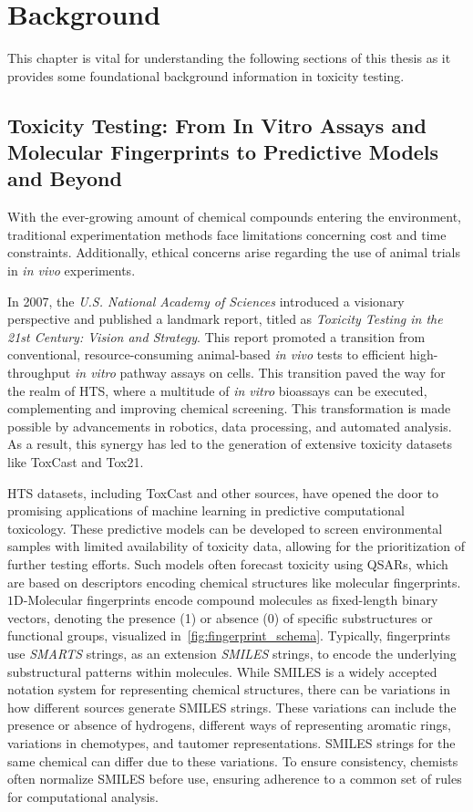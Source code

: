 \chapter{Background}\label{chap:background}
This chapter is vital for understanding the following sections of this thesis as it provides some foundational background information in toxicity testing.

\section{Toxicity Testing: From In Vitro Assays and Molecular Fingerprints to Predictive Models and Beyond}\label{sec:toxicity_testing}

With the ever-growing amount of chemical compounds entering the environment, traditional experimentation methods face limitations concerning cost and time constraints. Additionally, ethical concerns arise regarding the use of animal trials in \emph{in vivo} experiments.

In 2007, the \emph{U.S. National Academy of Sciences} introduced a visionary perspective and published a landmark report, titled as \emph{Toxicity Testing in the 21st Century: Vision and Strategy}. This report promoted a transition from conventional, resource-consuming animal-based \emph{in vivo} tests to efficient high-throughput \emph{in vitro} pathway assays on cells. This transition paved the way for the realm of HTS, where a multitude of \emph{in vitro} bioassays can be executed, complementing and improving chemical screening. This transformation is made possible by advancements in robotics, data processing, and automated analysis. As a result, this synergy has led to the generation of extensive toxicity datasets like ToxCast and Tox21.
 
HTS datasets, including ToxCast and other sources, have opened the door to promising applications of machine learning in predictive computational toxicology. These predictive models can be developed to screen environmental samples with limited availability of toxicity data, allowing for the prioritization of further testing efforts. Such models often forecast toxicity using QSARs, which are based on descriptors encoding chemical structures like molecular fingerprints. $1$D-Molecular fingerprints encode compound molecules as fixed-length binary vectors, denoting the presence (1) or absence (0) of specific substructures or functional groups, visualized in~\ref{fig:fingerprint_schema}. Typically, fingerprints use \emph{SMARTS} strings, as an extension \emph{SMILES} strings, to encode the underlying substructural patterns within molecules. While SMILES is a widely accepted notation system for representing chemical structures, there can be variations in how different sources generate SMILES strings. These variations can include the presence or absence of hydrogens, different ways of representing aromatic rings, variations in chemotypes, and tautomer representations. SMILES strings for the same chemical can differ due to these variations. To ensure consistency, chemists often normalize SMILES before use, ensuring adherence to a common set of rules for computational analysis.

